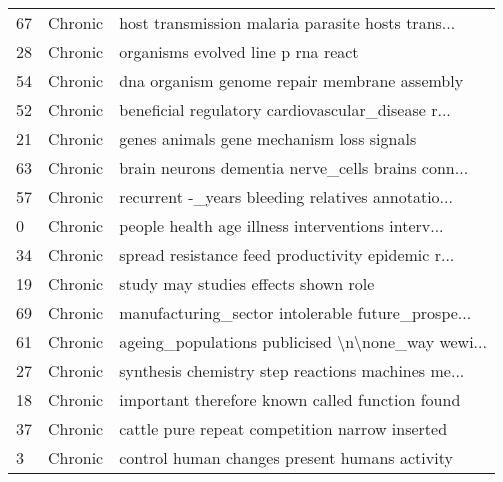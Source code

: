 \begin{tabular}{lll}
67                                                 &                                            Chronic &  host transmission malaria parasite hosts trans... \\
28                                                 &                                            Chronic &                 organisms evolved line p rna react \\
54                                                 &                                            Chronic &       dna organism genome repair membrane assembly \\
52                                                 &                                            Chronic &  beneficial regulatory cardiovascular\_disease r... \\
21                                                 &                                            Chronic &          genes animals gene mechanism loss signals \\
63                                                 &                                            Chronic &  brain neurons dementia nerve\_cells brains conn... \\
57                                                 &                                            Chronic &  recurrent -\_years bleeding relatives annotatio... \\
0                                                  &                                            Chronic &  people health age illness interventions interv... \\
34                                                 &                                            Chronic &  spread resistance feed productivity epidemic r... \\
19                                                 &                                            Chronic &               study may studies effects shown role \\
69                                                 &                                            Chronic &  manufacturing\_sector intolerable future\_prospe... \\
61                                                 &                                            Chronic &  ageing\_populations publicised \textbackslash n\textbackslash none\_way wewi... \\
27                                                 &                                            Chronic &  synthesis chemistry step reactions machines me... \\
18                                                 &                                            Chronic &    important therefore known called function found \\
37                                                 &                                            Chronic &     cattle pure repeat competition narrow inserted \\
3                                                  &                                            Chronic &      control human changes present humans activity \\
\bottomrule
\end{tabular}

